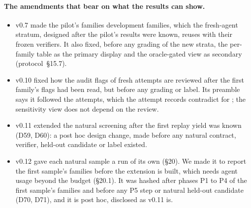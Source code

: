 \paragraph{The amendments that bear on what the results can show.}
\begin{itemize}
\item v0.7 made the pilot's families development families, which the fresh-agent stratum, designed after the pilot's
  results were known, reuses with their frozen verifiers. It also fixed, before any grading of the new strata, the
  per-family table as the primary display and the oracle-gated view as secondary (protocol~\S15.7).
\item v0.10 fixed how the audit flags of fresh attempts are reviewed after the first family's flags had been read, but
  before any grading or label. Its preamble says it followed the  attempts, which the attempt
  records contradict for ; the sensitivity view does not depend on the review.
\item v0.11 extended the natural screening after the first replay yield was known (D59, D60): a post hoc design change,
  made before any natural contract, verifier, held-out candidate or label existed.
\item v0.12 gave each natural sample a run of its own (\S20). We made it to report the first sample's families before
  the extension is built, which needs agent usage beyond the budget (\S20.1). It was hashed after phases P1 to P4 of the
  first sample's families and before any P5 step or natural held-out candidate (D70, D71), and it is post hoc,
  disclosed as v0.11 is.
\end{itemize}

